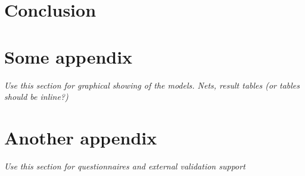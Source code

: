 \documentclass{UoYCSproject}
\begin{document}



\chapter{Conclusion}
\label{cha:conclusion}


\appendix
\chapter{Some appendix}
\textit{Use this section for graphical showing of the models. Nets, result tables (or tables should be inline?)}

\chapter{Another appendix}
\textit{Use this section for questionnaires and external validation support}

\printbibliography
\end{document}
